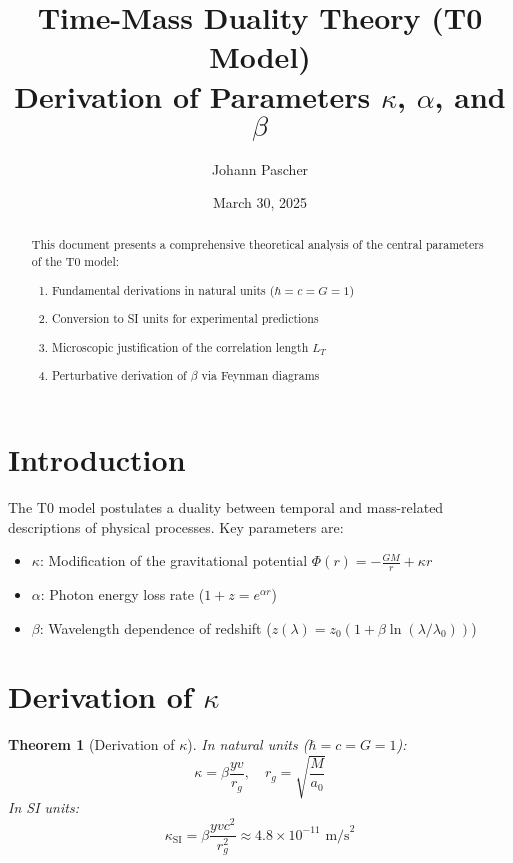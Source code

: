 \documentclass{article}
\title{Time-Mass Duality Theory (T0 Model) \\ Derivation of Parameters \(\kappa\), \(\alpha\), and \(\beta\)}
\author{Johann Pascher}
\date{March 30, 2025}
\newtheorem{theorem}{Theorem}[section]
\begin{document}
	
	\maketitle
	
	\begin{abstract}
		This document presents a comprehensive theoretical analysis of the central parameters of the T0 model:
		\begin{enumerate}
			\item Fundamental derivations in natural units (\(\hbar = c = G = 1\))
			\item Conversion to SI units for experimental predictions
			\item Microscopic justification of the correlation length \(L_T\)
			\item Perturbative derivation of \(\beta\) via Feynman diagrams
		\end{enumerate}
	\end{abstract}
	
	\tableofcontents
	\newpage
	
	\section{Introduction}
	The T0 model postulates a duality between temporal and mass-related descriptions of physical processes. Key parameters are:
	\begin{itemize}
		\item \(\kappa\): Modification of the gravitational potential \(\Phi(r) = -\frac{GM}{r} + \kappa r\)
		\item \(\alpha\): Photon energy loss rate (\(1 + z = e^{\alpha r}\))
		\item \(\beta\): Wavelength dependence of redshift (\(z(\lambda) = z_0 (1 + \beta \ln(\lambda/\lambda_0))\))
	\end{itemize}
	
	\section{Derivation of \(\kappa\)}
	\begin{theorem}[Derivation of \(\kappa\)]
		In natural units (\(\hbar = c = G = 1\)):
		\begin{equation}
			\kappa = \beta \frac{y v}{r_g}, \quad r_g = \sqrt{\frac{M}{a_0}}
		\end{equation}
		In SI units:
		\begin{equation}
			\kappa_{\text{SI}} = \beta \frac{y v c^2}{r_g^2} \approx 4.8 \times 10^{-11} \text{ m/s}^2
		\end{equation}
	\end{theorem}
	
\end{document}
